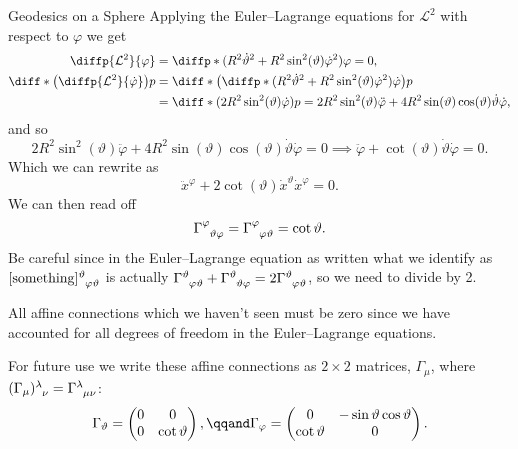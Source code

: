\documentclass[fleqn]{NotesClass}
\newcommand*{\christoffel}[3]{\tensor{\Gamma}{^{#1}_{{#2}{#3}}}}
\newcommand*{\lagrangian}{\mathcal{L}}
\begin{document}
\begin{exm}{Geodesics on a Sphere}{}
        Applying the Euler--Lagrange equations for \(\lagrangian^2\) with respect to \(\varphi\) we get
        \begin{align}
            \diffp{\lagrangian^2}{\varphi} &= \diffp*{(R^2\dot{\vartheta}^2 + R^2\sin^2(\vartheta)\dot{\varphi}^2)}{\varphi} = 0,\\
            \diff*{\left( \diffp{\lagrangian^2}{\dot{\varphi}} \right)}{p} &= \diff*{\left( \diffp*{(R^2\dot{\vartheta}^2 + R^2\sin^2(\vartheta)\dot{\varphi}^2)}{\dot{\varphi}} \right)}{p}\\
            &= \diff*{(2R^2\sin^2(\vartheta)\dot{\varphi})}{p} = 2R^2\sin^2(\vartheta)\ddot{\varphi} + 4R^2\sin(\vartheta)\cos(\vartheta) \dot{\vartheta}\dot{\varphi},
        \end{align}
        and so
        \begin{equation}
            2R^2\sin^2(\vartheta) \ddot{\varphi} + 4R^2\sin(\vartheta)\cos(\vartheta) \dot{\vartheta}\dot{\varphi} = 0 \implies \ddot{\varphi} + \cot(\vartheta) \dot{\vartheta} \dot{\varphi} = 0.
        \end{equation}
        Which we can rewrite as
        \begin{equation}
            \ddot{x}^\varphi + 2\cot(\vartheta) \dot{x}^\vartheta \dot{x}^\varphi = 0.
        \end{equation}
        We can then read off
        \begin{equation}
            \christoffel{\varphi}{\vartheta}{\varphi} = \christoffel{\varphi}{\varphi}{\vartheta} = \cot\vartheta.
        \end{equation}
        Be careful since in the Euler--Lagrange equation as written what we identify as \(\tensor{[\text{something}]}{^\vartheta_{\varphi\vartheta}}\) is actually \(\christoffel{\vartheta}{\varphi}{\vartheta} + \christoffel{\vartheta}{\vartheta}{\varphi} = 2\christoffel{\vartheta}{\varphi}{\vartheta}\), so we need to divide by 2.
        
        All affine connections which we haven't seen must be zero since we have accounted for all degrees of freedom in the Euler--Lagrange equations.
        
        For future use we write these affine connections as \(2 \times 2\) matrices, \(\Gamma_\mu\), where \(\tensor{(\Gamma_\mu)}{^\lambda_\nu} = \christoffel{\lambda}{\mu}{\nu}\):
        \begin{equation}\label{eqn:christoffel matrices S1}
            \Gamma_\vartheta = 
            \begin{pmatrix}
                0 & 0\\
                0 & \cot\vartheta
            \end{pmatrix}
            , \qqand \Gamma_\varphi = 
            \begin{pmatrix}
                0             & -\sin\vartheta\cos\vartheta\\
                \cot\vartheta & 0
            \end{pmatrix}
            .
        \end{equation}
    \end{exm}
    
\end{document}
